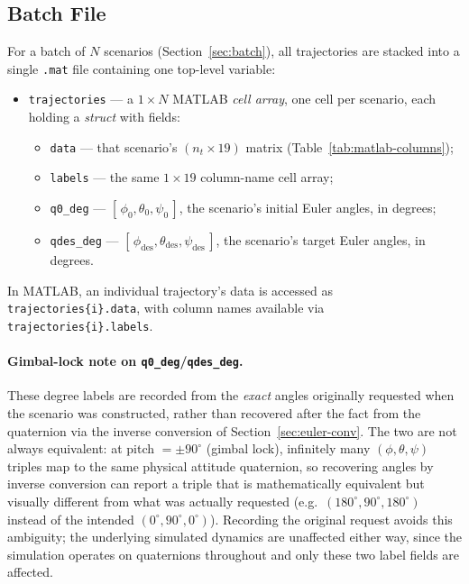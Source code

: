 \subsection{Batch File}
\label{sec:matlab-batch}

For a batch of $N$ scenarios (Section~\ref{sec:batch}), all trajectories
are stacked into a single \texttt{.mat} file containing one top-level
variable:
\begin{itemize}\setlength{\itemsep}{2pt}
  \item \texttt{trajectories} --- a $1\times N$ MATLAB \emph{cell array},
        one cell per scenario, each holding a \emph{struct} with fields:
    \begin{itemize}\setlength{\itemsep}{2pt}
      \item \texttt{data} --- that scenario's $(n_t\times 19)$ matrix
            (Table~\ref{tab:matlab-columns});
      \item \texttt{labels} --- the same $1\times 19$ column-name cell
            array;
      \item \texttt{q0\_deg} --- $[\,\phi_0,\theta_0,\psi_0\,]$, the
            scenario's initial Euler angles, in degrees;
      \item \texttt{qdes\_deg} --- $[\,\phi_{\text{des}},
            \theta_{\text{des}},\psi_{\text{des}}\,]$, the scenario's
            target Euler angles, in degrees.
    \end{itemize}
\end{itemize}
In MATLAB, an individual trajectory's data is accessed as
\texttt{trajectories\{i\}.data}, with column names available via
\texttt{trajectories\{i\}.labels}.

\paragraph{Gimbal-lock note on \texttt{q0\_deg}/\texttt{qdes\_deg}.} These
degree labels are recorded from the \emph{exact} angles originally
requested when the scenario was constructed, rather than recovered after
the fact from the quaternion via the inverse conversion of
Section~\ref{sec:euler-conv}. The two are not always equivalent: at pitch
$=\pm 90^\circ$ (gimbal lock), infinitely many $(\phi,\theta,\psi)$
triples map to the same physical attitude quaternion, so recovering
angles by inverse conversion can report a triple that is
mathematically equivalent but visually different from what was actually
requested (e.g.\ $(180^\circ,90^\circ,180^\circ)$ instead of the intended
$(0^\circ,90^\circ,0^\circ)$). Recording the original request avoids this
ambiguity; the underlying simulated dynamics are unaffected either way,
since the simulation operates on quaternions throughout and only these
two label fields are affected.


